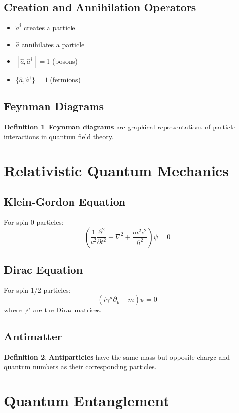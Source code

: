 \documentclass[11pt]{article}
\theoremstyle{definition}
\newtheorem{definition}{Definition}[section]
\begin{document}
\subsection{Creation and Annihilation Operators}
\begin{itemize}
    \item $\hat{a}^\dagger$ creates a particle
    \item $\hat{a}$ annihilates a particle
    \item $[\hat{a}, \hat{a}^\dagger] = 1$ (bosons)
    \item $\{\hat{a}, \hat{a}^\dagger\} = 1$ (fermions)
\end{itemize}

\subsection{Feynman Diagrams}
\begin{definition}
\textbf{Feynman diagrams} are graphical representations of particle interactions in quantum field theory.
\end{definition}

\section{Relativistic Quantum Mechanics}

\subsection{Klein-Gordon Equation}
For spin-0 particles:
$$\left(\frac{1}{c^2}\frac{\partial^2}{\partial t^2} - \nabla^2 + \frac{m^2c^2}{\hbar^2}\right)\psi = 0$$

\subsection{Dirac Equation}
For spin-1/2 particles:
$$(i\gamma^\mu\partial_\mu - m)\psi = 0$$
where $\gamma^\mu$ are the Dirac matrices.

\subsection{Antimatter}
\begin{definition}
\textbf{Antiparticles} have the same mass but opposite charge and quantum numbers as their corresponding particles.
\end{definition}

\section{Quantum Entanglement}
\end{document}
